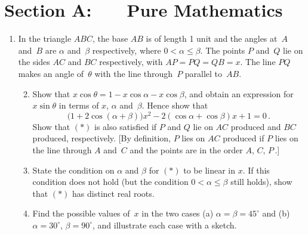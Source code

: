 \documentclass[a4, 11pt]{report}
\newlength{\qspace}
\newcounter{qnumber}
\newenvironment{question}%
 {\vspace{\qspace}
  \begin{enumerate}[\bfseries 1\quad][10]%
    \setcounter{enumi}{\value{qnumber}}%
    \item%
 }
{
  \end{enumerate}
  \filbreak
  \stepcounter{qnumber}
 }
\newenvironment{questionparts}[1][1]%
 {
  \begin{enumerate}[\bfseries (i)]%
    \setcounter{enumii}{#1}
    \addtocounter{enumii}{-1}
    \setlength{\itemsep}{5mm}
    \setlength{\parskip}{8pt}
 }
 {
  \end{enumerate}
 }
\def\le{\leqslant}
\renewcommand{\.}[1]{\ensuremath{\mathrm{#1}}}
\newcommand{\+}[1]{\ensuremath{\mathbf{#1}}}
\begin{document}
\setcounter{page}{2}

 
\section*{Section A: \ \ \ Pure Mathematics}

\begin{question}
  In the triangle $ABC$, the base $AB$ is of length 1 unit and the
  angles at~$A$ and~$B$ are $\alpha$ and~$\beta$ respectively, where
  $0<\alpha\le\beta$.  The points $P$ and~$Q$ lie on the sides $AC$ and
  $BC$ respectively, with $AP=PQ=QB=x$.  The line $PQ$ makes an angle
  of~$\theta$ with the line through~$P$ parallel to~$AB$.
  \begin{questionparts}
  \item Show that $x\cos\theta = 1- x\cos\alpha - x\cos\beta$, and 
 obtain an expression for $x\sin\theta$  in
    terms of $x$, $\alpha$ and~$\beta$.  Hence show that
    \begin{equation}
      \label{eq:2*}
      \bigl(1+2\cos(\alpha+\beta)\bigr)x^2 - 2(\cos\alpha +
      \cos\beta)x + 1 = 0\,. \tag{$*$}
    \end{equation}
Show that $(*)$ is also satisfied if $P$ and $Q$ lie  on  
$AC$ produced and $BC$ produced, respectively.  [By definition,
$P$ lies on $AC$ produced if $P$ lies on the line through $A$ and~$C$
and the points are in the order $A$, $C$, $P$\,.]

  \item
State the condition on $\alpha$ and $\beta$ for 
   $(*)$
 to be  linear in $x$.
If this condition does not hold (but the condition
$0<\alpha \le \beta$ still holds), show that 
$(*)$ has
distinct real roots.

  \item Find the possible values of~$x$ in the two  cases (a)
 $\alpha = \beta =    45^\circ$ and (b) 
$\alpha = 30^\circ$, $\beta = 90^\circ$, and 
illustrate each case with a sketch. 
\end{questionparts}
\end{question}
\end{document}
